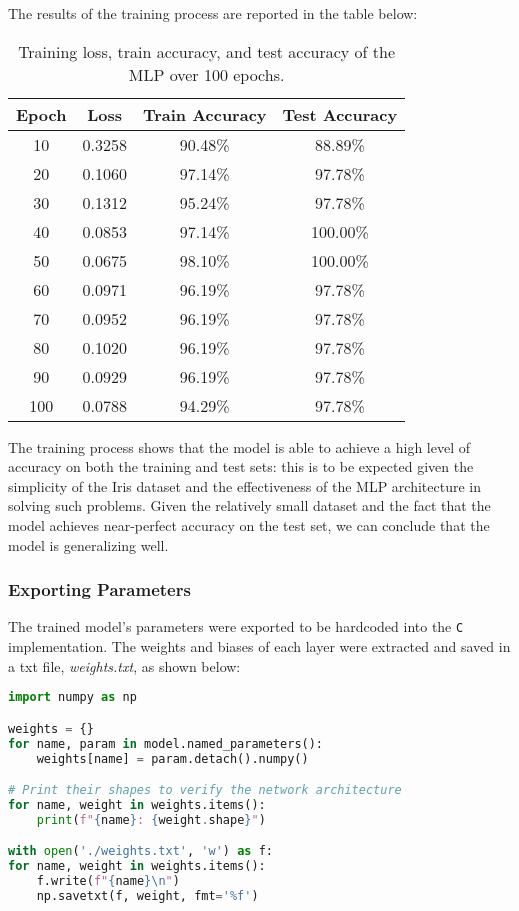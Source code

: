 \documentclass{article}
\begin{document}
The results of the training process are reported in the table below:
\begin{table}[H]
    \centering
    \begin{tabular}{|c|c|c|c|}
        \hline
        \textbf{Epoch} & \textbf{Loss} & \textbf{Train Accuracy} & \textbf{Test Accuracy} \\
        \hline
        10 & 0.3258 & 90.48\% & 88.89\% \\
        20 & 0.1060 & 97.14\% & 97.78\% \\
        30 & 0.1312 & 95.24\% & 97.78\% \\
        40 & 0.0853 & 97.14\% & 100.00\% \\
        50 & 0.0675 & 98.10\% & 100.00\% \\
        60 & 0.0971 & 96.19\% & 97.78\% \\
        70 & 0.0952 & 96.19\% & 97.78\% \\
        80 & 0.1020 & 96.19\% & 97.78\% \\
        90 & 0.0929 & 96.19\% & 97.78\% \\
        100 & 0.0788 & 94.29\% & 97.78\% \\
        \hline
    \end{tabular}
    \caption{\centering Training loss, train accuracy, and test accuracy of the MLP over 100 epochs.}
    \label{tab:mlp-training}
\end{table}


The training process shows that the model is able to achieve a high level of accuracy on both the training and test sets: this is to be expected given the simplicity of the Iris dataset and the effectiveness of the MLP architecture in solving such problems.
Given the relatively small dataset and the fact that the model achieves near-perfect accuracy on the test set, we can conclude that the model is generalizing well.

\subsubsection{Exporting Parameters}
The trained model's parameters were exported to be hardcoded into the \texttt{C} implementation. The weights and biases of each layer were extracted and saved in a txt file, \textit{weights.txt}, as shown below:
\begin{lstlisting}[language=Python]
import numpy as np

weights = {}
for name, param in model.named_parameters():
    weights[name] = param.detach().numpy()

# Print their shapes to verify the network architecture
for name, weight in weights.items():
    print(f"{name}: {weight.shape}")

with open('./weights.txt', 'w') as f:
for name, weight in weights.items():
    f.write(f"{name}\n")
    np.savetxt(f, weight, fmt='%f')
\end{lstlisting}
\end{document}
